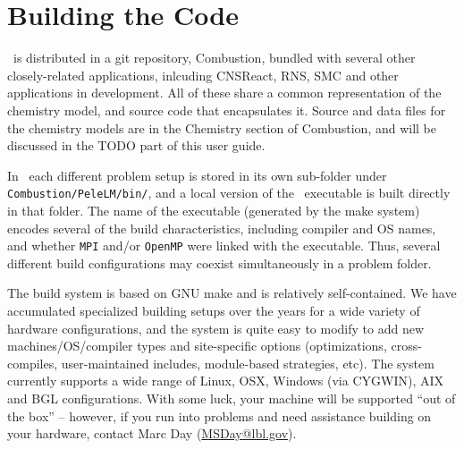 
\section{Building the Code}

\pelelm\ is distributed in a git repository, {\sf Combustion}, bundled with several other closely-related
applications, inlcuding {\sf CNSReact}, {\sf RNS}, {\sf SMC} and other applications in development.  All
of these share a common representation of the chemistry model, and source code that
encapsulates it.  Source and data files for the chemistry models are in the 
{\sf Chemistry} section of {\sf Combustion}, and will be discussed in the TODO part of this user guide.  

In \pelelm\ each different problem setup is stored in its own
sub-folder under {\tt Combustion/PeleLM/bin/}, and a local version of the 
\pelelm\ executable is built directly in that folder.  The name of the executable (generated by the make
system) encodes several of the build characteristics, including 
compiler and OS names, and whether {\tt MPI} and/or {\tt OpenMP} were linked with the executable.
Thus, several different build configurations may coexist simultaneously in a problem folder.

The build system is based on GNU make and is relatively self-contained.  We have accumulated 
specialized building setups over the years for a wide variety of hardware configurations, and 
the system is quite easy to modify to add new machines/OS/compiler types and site-specific 
options (optimizations, cross-compiles, user-maintained includes, module-based strategies, etc).
The system currently supports a wide range of Linux, OSX, Windows (via CYGWIN), AIX and BGL 
configurations. With some luck, your machine will be supported ``out of the box'' -- however, if 
you run into problems and need assistance building on your hardware, contact Marc Day (\url{MSDay@lbl.gov}).

